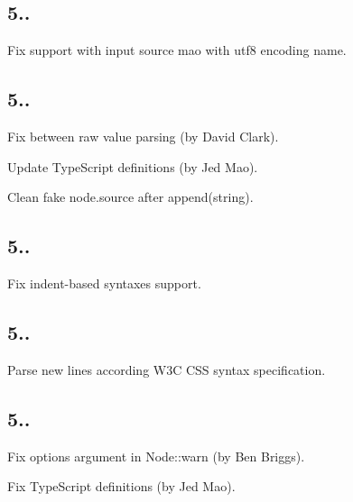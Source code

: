\subsection*{5..}


\begin{DoxyItemize}
\item Fix support with input source mao with {\ttfamily utf8} encoding name.
\end{DoxyItemize}

\subsection*{5..}


\begin{DoxyItemize}
\item Fix between raw value parsing (by David Clark).
\item Update Type\+Script definitions (by Jed Mao).
\item Clean fake node.\+source after {\ttfamily append(string)}.
\end{DoxyItemize}

\subsection*{5..}


\begin{DoxyItemize}
\item Fix indent-\/based syntaxes support.
\end{DoxyItemize}

\subsection*{5..}


\begin{DoxyItemize}
\item Parse new lines according W3C C\+SS syntax specification.
\end{DoxyItemize}

\subsection*{5..}


\begin{DoxyItemize}
\item Fix options argument in {\ttfamily Node\+::warn} (by Ben Briggs).
\item Fix Type\+Script definitions (by Jed Mao).
\end{DoxyItemize}

